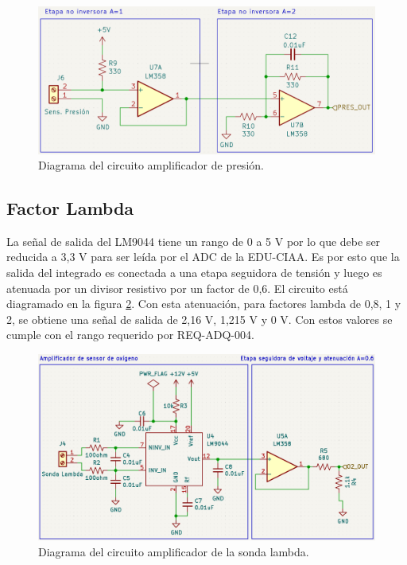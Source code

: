\begin{figure}[htpb]
\centering
\includegraphics[width=\textwidth]{./Figures/circuito-presion.png}
\caption{Diagrama del circuito amplificador de presión.}
\label{fig:circuito-presion}
\end{figure}
\break
\subsection{Factor Lambda}

La señal de salida del LM9044 tiene un rango de 0 a 5 V por lo que debe ser reducida a 3,3 V para ser leída por el ADC de la EDU-CIAA. Es por esto que la salida del integrado es conectada a una etapa seguidora de tensión y luego es atenuada por un divisor resistivo por un factor de 0,6. El circuito está diagramado en la figura \ref{fig:circuito-o2}. Con esta atenuación, para factores lambda de 0,8, 1 y 2, se obtiene una señal de salida de 2,16 V, 1,215 V y 0 V. Con estos valores se cumple con el rango requerido por REQ-ADQ-004.

\begin{figure}[htpb]
\centering
\includegraphics[width=\textwidth]{./Figures/ampli-o2.png}
\caption{Diagrama del circuito amplificador de la sonda lambda.}
\label{fig:circuito-o2}
\end{figure}

